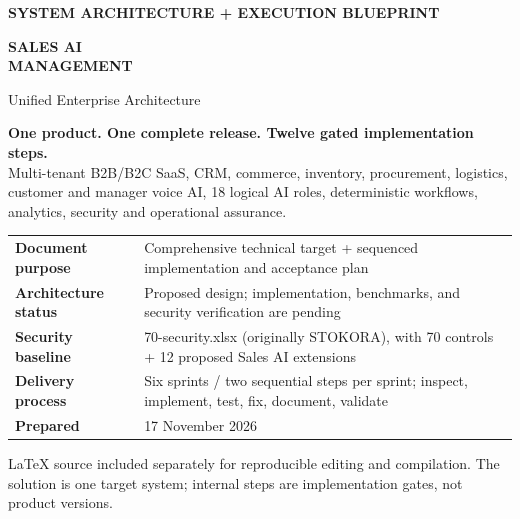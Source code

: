 \documentclass[10.5pt,a4paper,oneside]{article}
\newcommand{\tinyhint}[1]{{\sffamily\footnotesize\color{graytext}#1}}
\begin{document}
\begin{titlepage}
\thispagestyle{empty}
\vspace*{21mm}
{\sffamily\large\bfseries\color{white} SYSTEM ARCHITECTURE + EXECUTION BLUEPRINT}\par\vspace{14mm}
{\sffamily\fontsize{30}{36}\selectfont\bfseries\color{white} SALES AI\\[4pt] MANAGEMENT}\par\vspace{8mm}
{\sffamily\Large\color{white!84} Unified Enterprise Architecture}\par
\vspace*{34mm}
\begin{keybox}
\textbf{One product. One complete release. Twelve gated implementation steps.}\\
Multi-tenant B2B/B2C SaaS, CRM, commerce, inventory, procurement, logistics, customer and manager voice AI, 18 logical AI roles, deterministic workflows, analytics, security and operational assurance.
\end{keybox}
\vspace{8mm}
\begin{tabularx}{\textwidth}{@{}L{41mm}Y@{}}
\textbf{Document purpose} & Comprehensive technical target + sequenced implementation and acceptance plan\\
\textbf{Architecture status} & Proposed design; implementation, benchmarks, and security verification are pending\\
\textbf{Security baseline} & 70-security.xlsx (originally STOKORA), with 70 controls + 12 proposed Sales AI extensions\\
\textbf{Delivery process} & Six sprints / two sequential steps per sprint; inspect, implement, test, fix, document, validate\\
\textbf{Prepared} & 17 November 2026\\
\end{tabularx}
\vfill
\tinyhint{LaTeX source included separately for reproducible editing and compilation. The solution is one target system; internal steps are implementation gates, not product versions.}
\end{titlepage}
\tableofcontents
\clearpage
\end{document}
